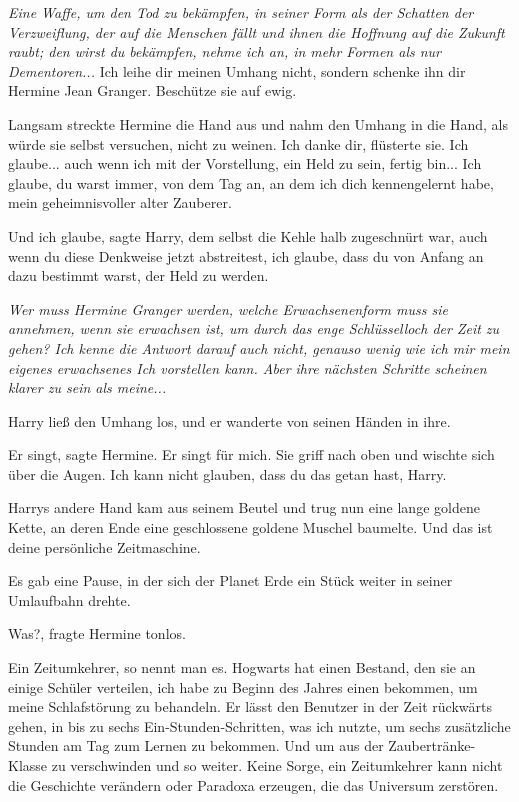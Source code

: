 \emph{Eine Waffe, um den Tod zu bekämpfen, in seiner Form als der Schatten der
Verzweiflung, der auf die Menschen fällt und ihnen die Hoffnung auf die Zukunft
raubt; den wirst du bekämpfen, nehme ich an, in mehr Formen als nur
Dementoren...} \glqq{}Ich leihe dir meinen Umhang nicht, sondern schenke ihn dir
Hermine Jean Granger. Beschütze sie auf ewig.\grqq{}

Langsam streckte Hermine die Hand aus und nahm den Umhang in die Hand, als würde
sie selbst versuchen, nicht zu weinen. \glqq{}Ich danke dir\grqq{}, flüsterte
sie. \glqq{}Ich glaube... auch wenn ich mit der Vorstellung, ein Held zu sein,
fertig bin... Ich glaube, du warst immer, von dem Tag an, an dem ich dich
kennengelernt habe, mein geheimnisvoller alter Zauberer.\grqq{}

\glqq{}Und ich glaube\grqq{}, sagte Harry, dem selbst die Kehle halb zugeschnürt
war, \glqq{}auch wenn du diese Denkweise jetzt abstreitest, ich glaube, dass du
von Anfang an dazu bestimmt warst, der Held zu werden.\grqq{}

\emph{Wer muss Hermine Granger werden, welche Erwachsenenform muss sie annehmen,
wenn sie erwachsen ist, um durch das enge Schlüsselloch der Zeit zu gehen? Ich
kenne die Antwort darauf auch nicht, genauso wenig wie ich mir mein eigenes
erwachsenes Ich vorstellen kann. Aber ihre nächsten Schritte scheinen klarer zu
sein als meine...}

Harry ließ den Umhang los, und er wanderte von seinen Händen in ihre.

\glqq{}Er singt\grqq{}, sagte Hermine. \glqq{}Er singt für mich.\grqq{} Sie griff
nach oben und wischte sich über die Augen. \glqq{}Ich kann nicht glauben, dass du
das getan hast, Harry.\grqq{}

Harrys andere Hand kam aus seinem Beutel und trug nun eine lange goldene Kette,
an deren Ende eine geschlossene goldene Muschel baumelte. \glqq{}Und das ist
deine persönliche Zeitmaschine.\grqq{}

Es gab eine Pause, in der sich der Planet Erde ein Stück weiter in seiner
Umlaufbahn drehte.

\glqq{}Was?\grqq{}, fragte Hermine tonlos.

\glqq{}Ein Zeitumkehrer, so nennt man es. Hogwarts hat einen Bestand, den sie an
einige Schüler verteilen, ich habe zu Beginn des Jahres einen bekommen, um meine
Schlafstörung zu behandeln. Er lässt den Benutzer in der Zeit rückwärts gehen,
in bis zu sechs Ein-Stunden-Schritten, was ich nutzte, um sechs zusätzliche
Stunden am Tag zum Lernen zu bekommen. Und um aus der Zaubertränke-Klasse zu
verschwinden und so weiter. Keine Sorge, ein Zeitumkehrer kann nicht die
Geschichte verändern oder Paradoxa erzeugen, die das Universum zerstören.\grqq{}

